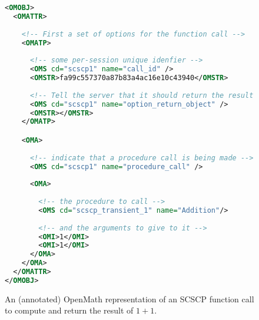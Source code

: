 \begin{figure}[h]
  \begin{center}
    \begin{lstlisting}[language=XML]
<OMOBJ>
  <OMATTR>
    
    <!-- First a set of options for the function call -->
    <OMATP>
      
      <!-- some per-session unique idenfier -->
      <OMS cd="scscp1" name="call_id" />
      <OMSTR>fa99c557370a87b83a4ac16e10c43940</OMSTR>
      
      <!-- Tell the server that it should return the result of the computation as an object -->
      <OMS cd="scscp1" name="option_return_object" />
      <OMSTR></OMSTR>
    </OMATP>

    <OMA>
      
      <!-- indicate that a procedure call is being made -->
      <OMS cd="scscp1" name="procedure_call" />
      
      <OMA>
        
        <!-- the procedure to call --> 
        <OMS cd="scscp_transient_1" name="Addition"/>
        
        <!-- and the arguments to give to it -->
        <OMI>1</OMI>
        <OMI>1</OMI>
      </OMA>
    </OMA>
  </OMATTR>
</OMOBJ>
\end{lstlisting}
  \end{center}
  
  \vspace*{-1.5em}
  

  \caption[SCSCP Client Example]{
    An (annotated) OpenMath representation of an SCSCP function call to compute and return the result of $1 + 1$. 
  }
  \label{fig:scscpcall}
\end{figure}